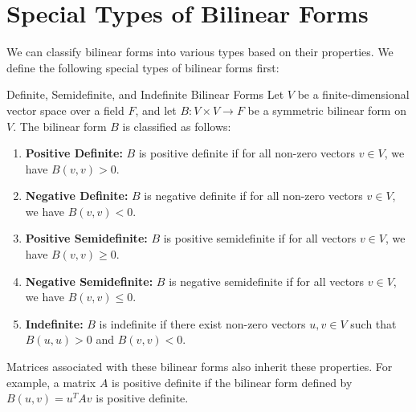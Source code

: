\documentclass[openany]{book}
\begin{document}
\section{Special Types of Bilinear Forms}
We can classify bilinear forms into various types based on their properties. We define the following special types of bilinear forms first: 
\begin{mydefinition}{Definite, Semidefinite, and Indefinite Bilinear Forms}
Let $V$ be a finite-dimensional vector space over a field $F$, and let $B: V \times V \to F$ be a symmetric bilinear form on $V$. The bilinear form $B$ is classified as follows:
\begin{enumerate}
    \item \textbf{Positive Definite:} $B$ is positive definite if for all non-zero vectors $v \in V$, we have $B(v, v) > 0$.
    \item \textbf{Negative Definite:} $B$ is negative definite if for all non-zero vectors $v \in V$, we have $B(v, v) < 0$.
    \item \textbf{Positive Semidefinite:} $B$ is positive semidefinite if for all vectors $v \in V$, we have $B(v, v) \geq 0$.
    \item \textbf{Negative Semidefinite:} $B$ is negative semidefinite if for all vectors $v \in V$, we have $B(v, v) \leq 0$.
    \item \textbf{Indefinite:} $B$ is indefinite if there exist non-zero vectors $u, v \in V$ such that $B(u, u) > 0$ and $B(v, v) < 0$.
\end{enumerate}
Matrices associated with these bilinear forms also inherit these properties. For example, a matrix $A$ is positive definite if the bilinear form defined by $B(u, v) = u^T A v$ is positive definite.
\end{mydefinition}
\end{document}
